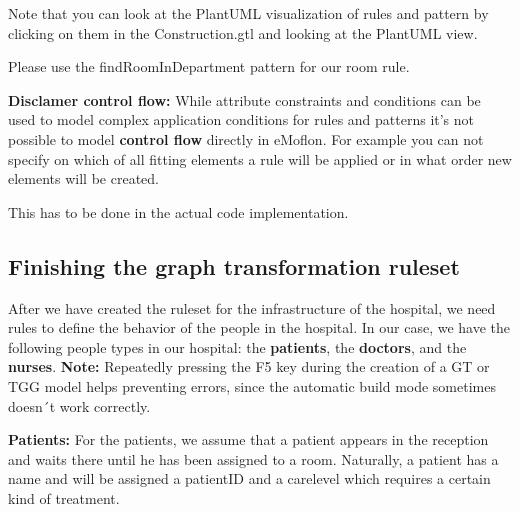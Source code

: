 Note that you can look at the PlantUML visualization of rules and pattern by clicking on them in the \textsf{Construction.gtl} and looking at the PlantUML view. \newline

Please use the \textsf{findRoomInDepartment} pattern for our room rule.\newline

\textbf{Disclamer control flow:}\newline
While attribute constraints and conditions can be used to model complex application conditions for rules and patterns
it's not possible to model \textbf{control flow} directly in eMoflon. For example you can not specify on which of all fitting elements a rule will be applied or in what order new elements will be created.

This has to be done in the actual code implementation.



\clearpage

\subsection{Finishing the graph transformation ruleset}

After we have created the ruleset for the infrastructure of the hospital, we need rules to define the behavior of the people in the hospital. In our case, we have the following people types in our hospital: the \textbf{patients}, the \textbf{doctors}, and the \textbf{nurses}.\newline
\textbf{Note:} Repeatedly pressing the F5 key during the creation of a GT or TGG model helps preventing errors, since the automatic build mode sometimes doesn´t work correctly.\newline

\textbf{Patients:}\newline
For the patients, we assume that a patient appears in the reception and waits there until he has been assigned to a room. Naturally, a patient has a name and will be assigned a patientID and a carelevel which requires a certain kind of treatment.\newline\newline

